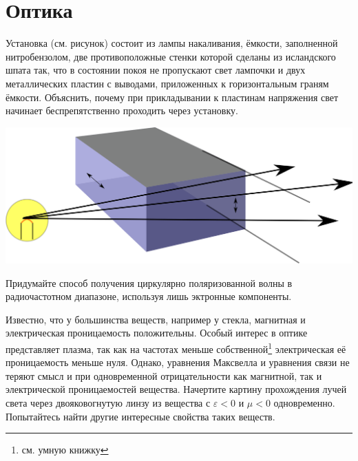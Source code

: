 \chapter{Оптика}
\thispagestyle{empty}
\clearpage
\begin{problem}
Установка (см. рисунок) состоит из лампы накаливания, ёмкости, заполненной нитробензолом, две противоположные стенки которой сделаны из исландского шпата так, что в состоянии покоя не пропускают свет лампочки и двух металлических пластин с выводами, приложенных к горизонтальным граням ёмкости. Объяснить, почему при прикладывании к пластинам напряжения свет начинает беспрепятственно проходить через установку.
{
\begin{center}
\includegraphics{./kerr}
\end{center}
}
\end{problem}
\begin{problem}
Придумайте способ получения циркулярно поляризованной волны в радиочастотном диапазоне, используя лишь эктронные компоненты.
\end{problem}
\begin{problem}
Известно, что у большинства веществ, например у стекла, магнитная и электрическая проницаемость положительны. Особый интерес в оптике представляет плазма, так как на частотах меньше собственной\footnote{см. умную книжку} электрическая её проницаемость меньше нуля. Однако, уравнения Максвелла и уравнения связи не теряют смысл и при одновременной отрицательности как магнитной, так и электрической проницаемостей вещества. Начертите картину прохождения лучей света через двояковогнутую линзу из вещества с $\varepsilon<0$ и $\mu<0$ одновременно. Попытайтесь найти другие интересные свойства таких веществ.
\end{problem}